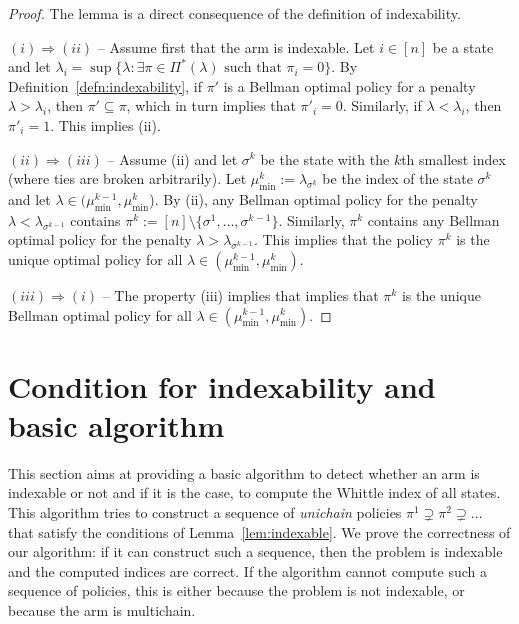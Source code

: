 \begin{proof}
    The lemma is a direct consequence of the definition of indexability.

    $(i)\Rightarrow(ii)$ -- Assume first that the arm is indexable. Let $i\in[n]$ be a state and let $\lambda_i=\sup\{\lambda : \exists\pi\in\Pi^*(\lambda)\text{ such that }\pi_i=0\}$. By Definition~\ref{defn:indexability}, if $\pi'$ is a Bellman optimal policy for a penalty $\lambda>\lambda_i$, then $\pi'\subseteq\pi$, which in turn implies that $\pi'_i=0$. Similarly, if $\lambda<\lambda_i$, then $\pi'_i=1$. This implies (ii).
    
    $(ii)\Rightarrow(iii)$ -- Assume (ii) and let $\sigma^k$ be the state with the $k$th smallest index (where ties are broken arbitrarily). Let $\mu^k_{\min}:=\lambda_{\sigma^k}$ be the index of the state $\sigma^k$ and let $\lambda\in(\mu^{k-1}_{\min},\mu^{k}_{\min}$). By (ii), any Bellman optimal policy for the penalty $\lambda<\lambda_{\sigma^{k-1}}$ contains $\pi^{k}:=[n]\setminus\{\sigma^1,\dots, \sigma^{k-1}\}$. Similarly, $\pi^{k}$ contains any Bellman optimal policy for the penalty $\lambda>\lambda_{\sigma^{k-1}}$.
        This implies that the policy $\pi^{k}$ is the unique optimal policy for all $\lambda\in(\mu^{k-1}_{\min},\mu^{k}_{\min})$. 

    $(iii)\Rightarrow(i)$ -- The property (iii) implies that implies that $\pi^k$ is the unique Bellman optimal policy for all $\lambda\in(\mu^{k-1}_{\min},\mu^k_{\min})$. 
\end{proof}


\section{Condition for indexability and basic algorithm}
\label{sec:widx_compute}

This section aims at providing a basic algorithm to detect whether an arm is indexable or not and if it is the case, to compute the Whittle index of all states.  This algorithm tries to construct a sequence of \emph{unichain} policies $\pi^1\supsetneq \pi^2\supsetneq\dots$ that satisfy the conditions of Lemma~\ref{lem:indexable}.  We prove the correctness of our algorithm: if it can construct such a sequence, then the problem is indexable and the computed indices are correct. If the algorithm cannot compute such a sequence of policies, this is either because the problem is not indexable, or because the arm is multichain.

